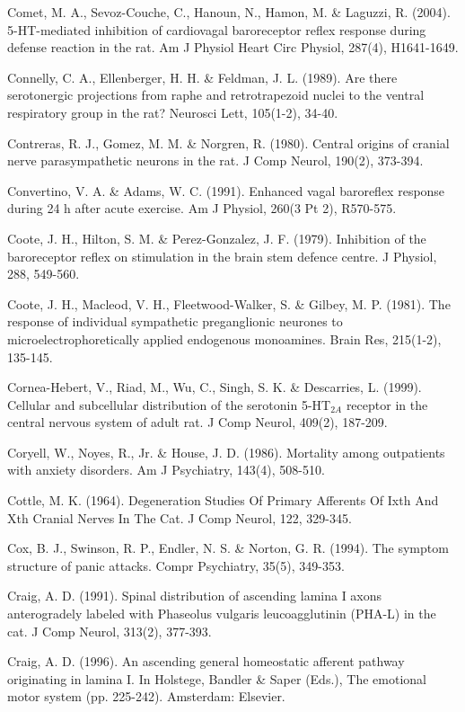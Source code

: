 \documentclass[a4paper,12pt,twoside]{report}
\begin{document}
\begin{singlespacing}
\begin{footnotesize}
Comet, M. A., Sevoz-Couche, C., Hanoun, N., Hamon, M. \& Laguzzi, R. (2004). 5-HT-mediated inhibition of cardiovagal baroreceptor reflex response during defense reaction in the rat. Am J Physiol Heart Circ Physiol, 287(4), H1641-1649.

Connelly, C. A., Ellenberger, H. H. \& Feldman, J. L. (1989). Are there serotonergic projections from raphe and retrotrapezoid nuclei to the ventral respiratory group in the rat? Neurosci Lett, 105(1-2), 34-40.

Contreras, R. J., Gomez, M. M. \& Norgren, R. (1980). Central origins of cranial nerve parasympathetic neurons in the rat. J Comp Neurol, 190(2), 373-394.

Convertino, V. A. \& Adams, W. C. (1991). Enhanced vagal baroreflex response during 24 h after acute exercise. Am J Physiol, 260(3 Pt 2), R570-575.

Coote, J. H., Hilton, S. M. \& Perez-Gonzalez, J. F. (1979). Inhibition of the baroreceptor reflex on stimulation in the brain stem defence centre. J Physiol, 288, 549-560.

Coote, J. H., Macleod, V. H., Fleetwood-Walker, S. \& Gilbey, M. P. (1981). The response of individual sympathetic preganglionic neurones to microelectrophoretically applied endogenous monoamines. Brain Res, 215(1-2), 135-145.

Cornea-Hebert, V., Riad, M., Wu, C., Singh, S. K. \& Descarries, L. (1999). Cellular and subcellular distribution of the serotonin 5-HT$_{2A}$ receptor in the central nervous system of adult rat. J Comp Neurol, 409(2), 187-209.

Coryell, W., Noyes, R., Jr. \& House, J. D. (1986). Mortality among outpatients with anxiety disorders. Am J Psychiatry, 143(4), 508-510.

Cottle, M. K. (1964). Degeneration Studies Of Primary Afferents Of Ixth And Xth Cranial Nerves In The Cat. J Comp Neurol, 122, 329-345.

Cox, B. J., Swinson, R. P., Endler, N. S. \& Norton, G. R. (1994). The symptom structure of panic attacks. Compr Psychiatry, 35(5), 349-353.

Craig, A. D. (1991). Spinal distribution of ascending lamina I axons anterogradely labeled with Phaseolus vulgaris leucoagglutinin (PHA-L) in the cat. J Comp Neurol, 313(2), 377-393.

Craig, A. D. (1996). An ascending general homeostatic afferent pathway originating in lamina I. In Holstege, Bandler \& Saper (Eds.), The emotional motor system (pp. 225-242). Amsterdam: Elsevier.


\end{footnotesize}
\end{singlespacing}
\end{document}
